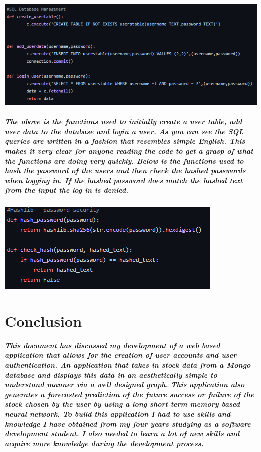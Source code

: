 \begin{center}    
    \includegraphics[scale=0.7]{img/sqlite.png}
\end{center}

\paragraph{The above is the functions used to initially create a user table, add user data to the database and login a user. As you can see the SQL queries are written in a fashion that resembles simple English. This makes it very clear for anyone reading the code to get a grasp of what the functions are doing very quickly. Below is the functions used to hash the password of the users and then check the hashed passwords when logging in. If the hashed password does match the hashed text from the input the log in is denied.}

\begin{center}    
    \includegraphics[scale=1]{img/hashlib.png}
\end{center}

\chapter{Conclusion}

\paragraph{This document has discussed my development of a web based application that allows for the creation of user accounts and user authentication. An application that takes in stock data from a Mongo database and displays this data in an aesthetically simple to understand manner via a well designed graph. This application also generates a forecasted prediction of the future success or failure of the stock chosen by the user by using a long short term memory based neural network. To build this application I had to use skills and knowledge I have obtained from my four years studying as a software development student. I also needed to learn a lot of new skills and acquire more knowledge during the development process.}

